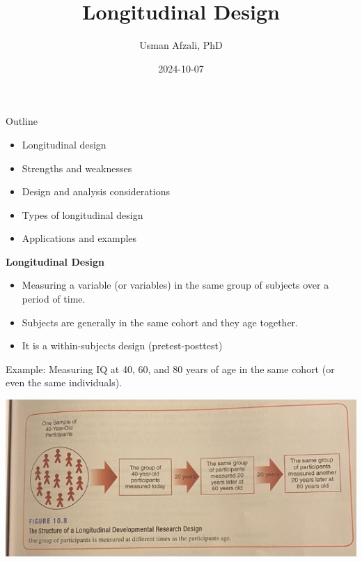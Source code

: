 \documentclass[
  ignorenonframetext,
  aspectratio=169,
]{beamer}
\title{Longitudinal Design}
\author{Usman Afzali, PhD}
\date{2024-10-07}
\providecommand{\tightlist}{%
  \setlength{\itemsep}{0pt}\setlength{\parskip}{0pt}}\usepackage{longtable,booktabs,array}
\begin{document}
\frame{\titlepage}

\begin{frame}{Outline}
\label{outline}
\begin{itemize}
\tightlist
\item
  Longitudinal design
\item
  Strengths and weaknesses
\item
  Design and analysis considerations
\item
  Types of longitudinal design
\item
  Applications and examples
\end{itemize}
\end{frame}

\begin{frame}
\textbf{Longitudinal Design}

\begin{itemize}[<+->]
\tightlist
\item
  Measuring a variable (or variables) in the same group of subjects over
  a period of time.
\item
  Subjects are generally in the same cohort and they age together.
\item
  It is a within-subjects design (pretest-posttest)
\end{itemize}
\end{frame}

\begin{frame}
Example: Measuring IQ at 40, 60, and 80 years of age in the same cohort
(or even the same individuals).

\begin{center}
\includegraphics{figs/iq.jpg}
\end{center}
\end{frame}
\end{document}
